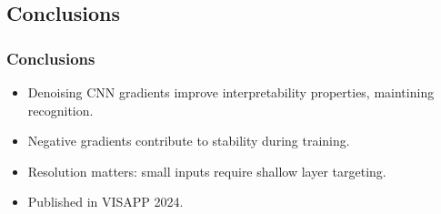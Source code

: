 \subsection*{Conclusions}
\begin{frame}
    \frametitle{Conclusions}
    \small
    \begin{itemize}
        \item Denoising CNN gradients improve interpretability properties, maintining recognition.
        \item Negative gradients contribute to stability during training.
        \item Resolution matters: small inputs require shallow layer targeting. 
        \item Published in VISAPP 2024.
    \end{itemize}
    
\end{frame}